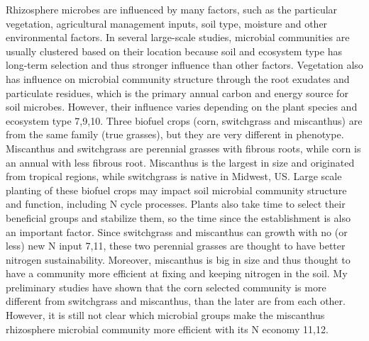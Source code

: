 \documentclass[12pt]{article}
\begin{document}
Rhizosphere microbes are influenced by many factors, such as the particular vegetation, agricultural management inputs, soil type, moisture and other environmental factors. In several large-scale studies, microbial communities are usually clustered based on their location because soil and ecosystem type has long-term selection and thus stronger influence than other factors. Vegetation also has influence on microbial community structure through the root exudates and particulate residues, which is the primary annual carbon and energy source for soil microbes. However, their influence varies depending on the plant species and ecosystem type 7,9,10. Three biofuel crops (corn, switchgrass and miscanthus) are from the same family (true grasses), but they are very different in phenotype. Miscanthus and switchgrass are perennial grasses with fibrous roots, while corn is an annual with less fibrous root. Miscanthus is the largest in size and originated from tropical regions, while switchgrass is native in Midwest, US. Large scale planting of these biofuel crops may impact soil microbial community structure and function, including N cycle processes. Plants also take time to select their beneficial groups and stabilize them, so the time since the establishment is also an important factor. Since switchgrass and miscanthus can growth with no (or less) new N input 7,11, these two perennial grasses are thought to have better nitrogen sustainability. Moreover, miscanthus is big in size and thus thought to have a community more efficient at fixing and keeping nitrogen in the soil. My preliminary studies have shown that the corn selected community is more different from switchgrass and miscanthus, than the later are from each other. However, it is still not clear which microbial groups make the miscanthus rhizosphere microbial community more efficient with its N economy 11,12.
\end{document}

